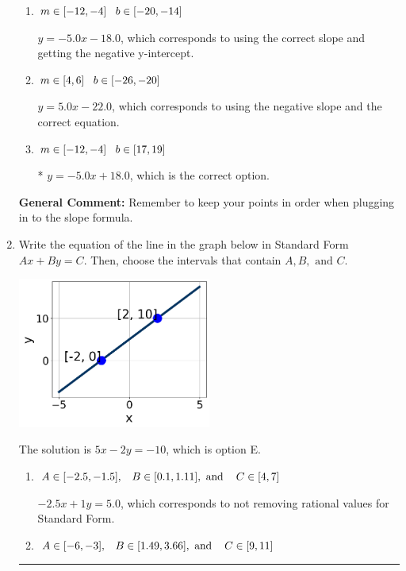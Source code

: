 \documentclass{extbook}[14pt]
\newcommand{\litem}[1]{\item #1

\rule{\textwidth}{0.4pt}}
\begin{document}
\begin{enumerate}
{\begin{enumerate}[label=\Alph*.]
 $y = -5.0x -6$, which corresponds to using the correct slope/equation but not distributing correctly using the second point.
\item \( m \in [-12, -4] \hspace*{3mm} b \in [-20, -14] \)

 $y = -5.0x -18.0$, which corresponds to using the correct slope and getting the negative y-intercept.
\item \( m \in [4, 6] \hspace*{3mm} b \in [-26, -20] \)

 $y = 5.0x -22.0$, which corresponds to using the negative slope and the correct equation.
\item \( m \in [-12, -4] \hspace*{3mm} b \in [17, 19] \)

* $y = -5.0x + 18.0$, which is the correct option.
\end{enumerate}

\textbf{General Comment:} Remember to keep your points in order when plugging in to the slope formula.
}
\litem{
Write the equation of the line in the graph below in Standard Form $Ax+By=C$. Then, choose the intervals that contain $A, B, \text{ and } C$.

\begin{center}
    \includegraphics[width=0.5\textwidth]{../Figures/linearGraphToStandardCopyC.png}
\end{center}


The solution is \( 5x - 2y = -10 \), which is option E.\begin{enumerate}[label=\Alph*.]
\item \( A \in [-2.5, -1.5], \hspace{3mm} B \in [0.1, 1.11], \text{ and } \hspace{3mm} C \in [4, 7] \)

 $-2.5x + 1y = 5.0$, which corresponds to not removing rational values for Standard Form.
\item \( A \in [-6, -3], \hspace{3mm} B \in [1.49, 3.66], \text{ and } \hspace{3mm} C \in [9, 11] \)


\end{enumerate}}
\end{enumerate}
\end{document}
